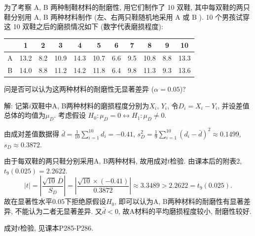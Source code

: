 \documentclass[standard]{ExBook}
\renewenvironment{shaded}{%
  \def\FrameCommand{\fboxsep=\FrameSep \colorbox{shadecolor}}%
  \MakeFramed{\advance\hsize-\width \FrameRestore}%
}{%
  \endMakeFramed
}
\begin{document}
\begin{qitems}
    \begin{bbox}
    \begin{shaded}
        \qitem
为了考察 A, B 两种制鞋材料的耐磨性, 用它们制作了 10 双鞋, 其中每双鞋的两只鞋分别用 A, B 两种材料制作 (左、右两只鞋随机地采用 A 或 B ). 10 个男孩试穿这 10 双鞋之后的磨损情况如下 (数字代表磨损程度):
\begin{center}
\setlength{\tabcolsep}{12pt}
\begin{tabular}{c|cccccccccc}
\hline
 & 1 & 2 & 3 & 4 & 5 & 6 & 7 & 8 & 9 & 10 \\
\hline
A & 13.2 & 8.2 & 10.9 & 14.3 & 10.7 & 6.6 & 9.5 & 10.8 & 8.8 & 13.3 \\
B & 14.0 & 8.8 & 11.2 & 14.2 & 11.8 & 6.4 & 9.8 & 11.3 & 9.3 & 13.6 \\
\hline
\end{tabular}
\end{center}
问是否可以认为这两种材料的耐磨性无显著差异 ($\alpha=0.05$)?
    \end{shaded}
    \end{bbox}

\vspace{\dimexpr2.5cm-5em\relax}

解: 记第$i$双鞋中A, B两种材料的磨损程度分别为$X_i$, $Y_i$, 令$D_i=X_i-Y_i$, 并设差值总体的均值为$\mu_D$. 考虑假设
$
H_0:\mu_D=0
\longleftrightarrow
H_1:\mu_D\neq0
$.

由成对差值数据得
$
\bar{d}
=\frac{1}{10}\sum_{i=1}^{10}d_i
=-0.41
$,
$
s_D^2
=\frac{1}{9}\sum_{i=1}^{10}(d_i-\bar{d})^2
\approx0.1499
$,
$
s_D\approx0.3872
$.

由于每双鞋的两只鞋分别采用A, B两种材料, 故用成对$t$检验. 由课本后的附表2, $t_9(0.025)=2.2622$.
$$
|t|
=
\left|
\frac{\sqrt{10}\,\overline{D}}{S_D}
\right|
=
\left|
\frac{\sqrt{10}\times(-0.41)}{0.3872}
\right|
\approx3.3489
>
2.2622
=
t_9(0.025).
$$
故在显著性水平$0.05$下拒绝原假设$H_0$, 即可以认为A, B两种材料的耐磨性有显著差异, 不能认为二者无显著差异. 又$\bar{d}<0$, 故A材料的平均磨损程度较小, 耐磨性较好.

\textcolor{themeColor}{\selectfont {} 成对$t$检验, 见课本P285-P286.}

\vspace{2.5cm-5em}


\end{qitems}
\end{document}
